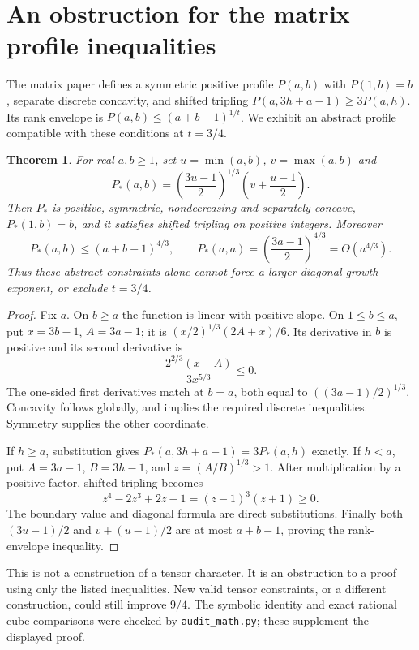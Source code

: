 \documentclass[11pt]{article}
\newtheorem{theorem}{Theorem}
\begin{document}
\section{An obstruction for the matrix profile inequalities}
The matrix paper defines a symmetric positive profile $P(a,b)$ with
$P(1,b)=b$, separate discrete concavity, and shifted tripling
$P(a,3h+a-1)\ge3P(a,h)$. Its rank envelope is
$P(a,b)\le(a+b-1)^{1/t}$. We exhibit an abstract profile compatible with
these conditions at $t=3/4$.

\begin{theorem}\label{thm:barrier}
For real $a,b\ge1$, set $u=\min(a,b)$, $v=\max(a,b)$ and
\[
 P_*(a,b)=\left(\frac{3u-1}{2}\right)^{1/3}
                      \left(v+\frac{u-1}{2}\right).
\]
Then $P_*$ is positive, symmetric, nondecreasing and separately concave,
$P_*(1,b)=b$, and it satisfies shifted tripling on positive integers.
Moreover
\[
 P_*(a,b)\le(a+b-1)^{4/3},\qquad
 P_*(a,a)=\left(\frac{3a-1}{2}\right)^{4/3}=\Theta(a^{4/3}).
\]
Thus these abstract constraints alone cannot force a larger diagonal
growth exponent, or exclude $t=3/4$.
\end{theorem}
\begin{proof}
Fix $a$. On $b\ge a$ the function is linear with positive slope.
On $1\le b\le a$, put $x=3b-1$, $A=3a-1$; it is
$(x/2)^{1/3}(2A+x)/6$. Its derivative in $b$ is positive and its
second derivative is
\[
 \frac{2^{2/3}(x-A)}{3x^{5/3}}\le0.
\]
The one-sided first derivatives match at $b=a$, both equal to
$((3a-1)/2)^{1/3}$. Concavity follows globally, and implies the required
discrete inequalities. Symmetry supplies the other coordinate.

If $h\ge a$, substitution gives
$P_*(a,3h+a-1)=3P_*(a,h)$ exactly. If $h<a$, put
$A=3a-1$, $B=3h-1$, and $z=(A/B)^{1/3}>1$.
After multiplication by a positive factor, shifted tripling becomes
\[
 z^4-2z^3+2z-1=(z-1)^3(z+1)\ge0.
\]
The boundary value and diagonal formula are direct substitutions.
Finally both $(3u-1)/2$ and $v+(u-1)/2$ are at most $a+b-1$,
proving the rank-envelope inequality.
\end{proof}
This is not a construction of a tensor character. It is an obstruction
to a proof using only the listed inequalities. New valid tensor
constraints, or a different construction, could still improve $9/4$.
The symbolic identity and exact rational cube comparisons were checked
by \texttt{audit\_math.py}; these supplement the displayed proof.
\end{document}
